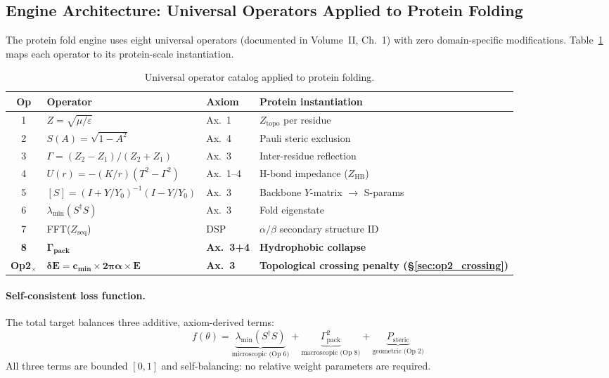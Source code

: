 \subsection{Engine Architecture: Universal Operators Applied to Protein Folding}
\label{sec:engine_architecture}

The protein fold engine uses eight universal operators
(documented in Volume~II, Ch.~1) with zero domain-specific
modifications.  Table~\ref{tab:op_catalog} maps each operator
to its protein-scale instantiation.

\begin{table}[H]
\centering\small
\caption{Universal operator catalog applied to protein folding.}
\label{tab:op_catalog}
\begin{tabular}{clll}
\toprule
\textbf{Op} & \textbf{Operator} & \textbf{Axiom}
  & \textbf{Protein instantiation} \\
\midrule
1 & $Z = \sqrt{\mu/\varepsilon}$
  & Ax.~1
  & $Z_\text{topo}$ per residue \\
2 & $S(A) = \sqrt{1-A^2}$
  & Ax.~4
  & Pauli steric exclusion \\
3 & $\Gamma = (Z_2-Z_1)/(Z_2+Z_1)$
  & Ax.~3
  & Inter-residue reflection \\
4 & $U(r) = -(K/r)(T^2-\Gamma^2)$
  & Ax.~1--4
  & H-bond impedance ($Z_\text{HB}$) \\
5 & $[S] = (I+Y/Y_0)^{-1}(I-Y/Y_0)$
  & Ax.~3
  & Backbone $Y$-matrix $\to$ S-params \\
6 & $\lambda_\text{min}(S^\dagger S)$
  & Ax.~3
  & Fold eigenstate \\
7 & FFT($Z_\text{seq}$)
  & DSP
  & $\alpha/\beta$ secondary structure ID \\
\textbf{8} & $\boldsymbol{\Gamma_\text{pack}}$
  & \textbf{Ax.~3+4}
  & \textbf{Hydrophobic collapse} \\
\textbf{Op2$_\times$} & $\boldsymbol{\delta E = c_{\min} \times 2\pi\alpha \times E}$
  & \textbf{Ax.~3}
  & \textbf{Topological crossing penalty (\S\ref{sec:op2_crossing})} \\
\bottomrule
\end{tabular}
\end{table}

\paragraph{Self-consistent loss function.}
The total target balances three additive, axiom-derived terms:
\begin{equation}
    f(\theta) = \underbrace{\lambda_\text{min}(S^\dagger S)}_{\text{microscopic (Op 6)}}
              + \underbrace{\Gamma_\text{pack}^2}_{\text{macroscopic (Op 8)}}
              + \underbrace{P_\text{steric}}_{\text{geometric (Op 2)}}
    \label{eq:self_consistent_loss}
\end{equation}
All three terms are bounded $[0,1]$ and self-balancing:
no relative weight parameters are required.

